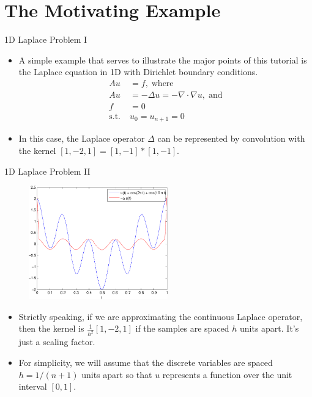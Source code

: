 \documentclass{beamer}
\begin{document}
\section{The Motivating Example}%

\begin{frame}{1D Laplace Problem I}
 \begin{itemize}
  \item A simple example that serves to illustrate the major points of this
        tutorial is the Laplace equation in 1D with Dirichlet boundary
        conditions.
  \begin{align}
   Au &= f, \; \text{where} \label{eq:laplace} \\
   Au &= -\Delta u = - \nabla \cdot \nabla u, \; \text{and} \nonumber \\
   f &= 0 \nonumber \\
   \text{s.t.} \; & u_0 = u_{n+1} = 0 \nonumber
  \end{align}
  \item In this case, the Laplace operator $\Delta$ can be represented by
        convolution with the kernel $[1,-2,1] = [1,-1]\ast[1,-1]$.
 \end{itemize}
\end{frame}

\begin{frame}{1D Laplace Problem II}
 \begin{figure}
  \includegraphics[width=6cm]{images/laplaceOperatorExample.pdf}
 \end{figure}
 \begin{itemize}
  \item Strictly speaking, if we are approximating the continuous Laplace
        operator, then the kernel is $\frac{1}{h^2}[1,-2,1]$ if the samples
        are spaced $h$ units apart. It's just a scaling factor.
  \item For simplicity, we will assume that the discrete variables are spaced
        $h = 1/(n+1)$ units apart so that $u$ represents a function over the
        unit interval $[0,1]$.
 \end{itemize}
\end{frame}
\end{document}
